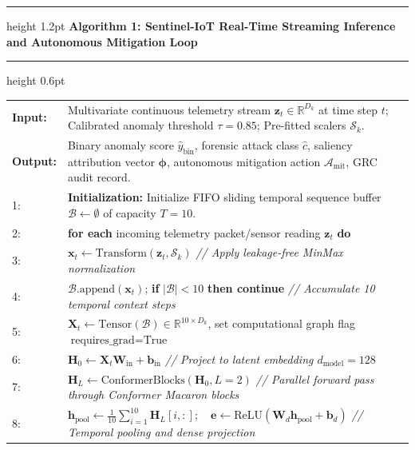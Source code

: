 \documentclass[11pt,a4paper]{article}
\begin{document}
\vspace{1em}
\noindent\begin{minipage}{\textwidth}
\hrule height 1.2pt
\vspace{0.4em}
\noindent\textbf{Algorithm 1: Sentinel-IoT Real-Time Streaming Inference and Autonomous Mitigation Loop}
\vspace{0.4em}
\hrule height 0.6pt
\vspace{0.6em}
\small
\begin{tabularx}{\textwidth}{lX}
\textbf{Input:} & Multivariate continuous telemetry stream $\mathbf{z}_t \in \mathbb{R}^{D_k}$ at time step $t$; Calibrated anomaly threshold $\tau = 0.85$; Pre-fitted scalers $\mathcal{S}_k$. \\
\textbf{Output:} & Binary anomaly score $\hat{y}_{\text{bin}}$, forensic attack class $\hat{c}$, saliency attribution vector $\boldsymbol{\phi}$, autonomous mitigation action $\mathcal{A}_{\text{mit}}$, GRC audit record. \\
\midrule
1: & \textbf{Initialization:} Initialize FIFO sliding temporal sequence buffer $\mathcal{B} \leftarrow \emptyset$ of capacity $T = 10$. \\
2: & \textbf{for each} incoming telemetry packet/sensor reading $\mathbf{z}_t$ \textbf{do} \\
3: & \quad $\mathbf{x}_t \leftarrow \text{Transform}(\mathbf{z}_t, \mathcal{S}_k)$ \hfill \textit{// Apply leakage-free MinMax normalization} \\
4: & \quad $\mathcal{B}.\text{append}(\mathbf{x}_t)$; \textbf{if} $|\mathcal{B}| < 10$ \textbf{then continue} \hfill \textit{// Accumulate 10 temporal context steps} \\
5: & \quad $\mathbf{X}_t \leftarrow \text{Tensor}(\mathcal{B}) \in \mathbb{R}^{10 \times D_k}$, set computational graph flag $\text{requires\_grad}=\text{True}$ \\
6: & \quad $\mathbf{H}_0 \leftarrow \mathbf{X}_t \mathbf{W}_{\text{in}} + \mathbf{b}_{\text{in}}$ \hfill \textit{// Project to latent embedding $d_{\text{model}} = 128$} \\
7: & \quad $\mathbf{H}_L \leftarrow \text{ConformerBlocks}(\mathbf{H}_0, L=2)$ \hfill \textit{// Parallel forward pass through Conformer Macaron blocks} \\
8: & \quad $\mathbf{h}_{\text{pool}} \leftarrow \frac{1}{10} \sum_{i=1}^{10} \mathbf{H}_L[i, :]; \quad \mathbf{e} \leftarrow \text{ReLU}(\mathbf{W}_d \mathbf{h}_{\text{pool}} + \mathbf{b}_d)$ \hfill \textit{// Temporal pooling and dense projection} \\

\end{tabularx}
\end{minipage}
\end{document}
